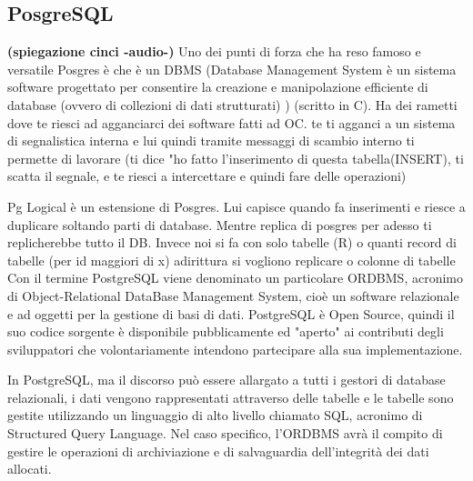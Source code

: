 \subsection{PosgreSQL}

\textbf{(spiegazione cinci -audio-)}
Uno dei punti di forza che ha reso famoso e versatile Posgres è che è un DBMS (Database Management System è un sistema software progettato per consentire la creazione e manipolazione efficiente di database (ovvero di collezioni di dati strutturati) ) (scritto in C). Ha dei rametti dove te riesci ad agganciarci dei software fatti ad OC. te ti agganci a un sistema di segnalistica interna e lui quindi tramite messaggi di scambio interno ti permette di lavorare (ti dice "ho fatto l'inserimento di questa tabella(INSERT), ti scatta il segnale, e te riesci a intercettare e quindi fare delle operazioni)

Pg Logical è un estensione di Posgres. Lui capisce quando fa inserimenti e riesce a duplicare soltando parti di database. Mentre replica di posgres per adesso ti replicherebbe tutto il DB. Invece noi si fa con solo tabelle (R) o quanti record di tabelle (per id maggiori di x) adirittura si vogliono replicare o colonne di tabelle \\


Con il termine PostgreSQL viene denominato un particolare ORDBMS, acronimo di Object-Relational DataBase Management System, cioè un software relazionale e ad oggetti per la gestione di basi di dati.
PostgreSQL è Open Source, quindi il suo codice sorgente è disponibile pubblicamente ed "aperto" ai contributi degli sviluppatori che volontariamente intendono partecipare alla sua implementazione.

In PostgreSQL, ma il discorso può essere allargato a tutti i gestori di database relazionali, i dati vengono rappresentati attraverso delle tabelle e le tabelle sono gestite utilizzando un linguaggio di alto livello chiamato SQL, acronimo di Structured Query Language.
Nel caso specifico, l'ORDBMS avrà il compito di gestire le operazioni di archiviazione e di salvaguardia dell'integrità dei dati allocati.

